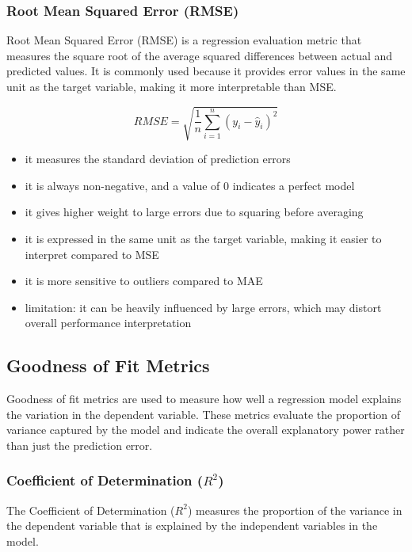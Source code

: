 \documentclass{article}
\begin{document}
\subsubsection{Root Mean Squared Error (RMSE)}

Root Mean Squared Error (RMSE) is a regression evaluation metric that measures the square root of the average squared differences between actual and predicted values. It is commonly used because it provides error values in the same unit as the target variable, making it more interpretable than MSE.

\begin{equation}
    RMSE = \sqrt{\frac{1}{n} \sum_{i=1}^{n} \left( y_i - \hat{y}_i \right)^2}
\end{equation}

\begin{itemize}
    \item it measures the standard deviation of prediction errors
    \item it is always non-negative, and a value of 0 indicates a perfect model
    \item it gives higher weight to large errors due to squaring before averaging
    \item it is expressed in the same unit as the target variable, making it easier to interpret compared to MSE
    \item it is more sensitive to outliers compared to MAE
    \item limitation: it can be heavily influenced by large errors, which may distort overall performance interpretation
\end{itemize}

\subsection{Goodness of Fit Metrics}
Goodness of fit metrics are used to measure how well a regression model explains the variation in the dependent variable. These metrics evaluate the proportion of variance captured by the model and indicate the overall explanatory power rather than just the prediction error.


\subsubsection{Coefficient of Determination ($R^2$)}

    The Coefficient of Determination ($R^2$) measures the proportion of the variance in the dependent variable that is explained by the independent variables in the model.
\end{document}
